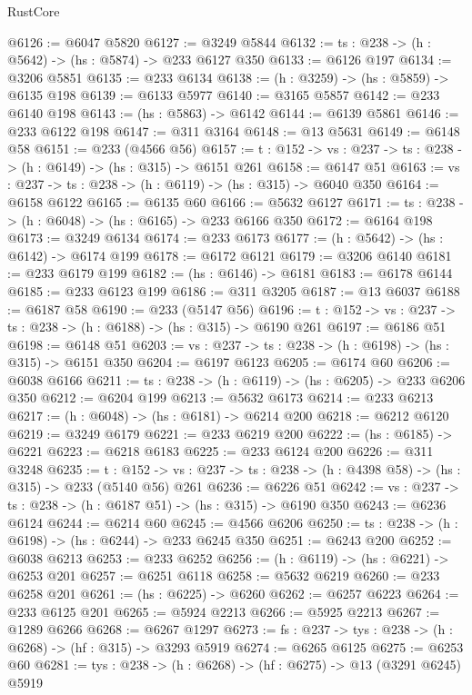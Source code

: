 \begin{lexlean}{RustCore}
\begin{coremodule}
@6126 := @6047 @5820
@6127 := @3249 @5844
@6132 := {ts : @238} -> (h : @5642) -> (hs : @5874) -> @233 @6127 @350
@6133 := @6126 @197
@6134 := @3206 @5851
@6135 := @233 @6134
@6138 := (h : @3259) -> (hs : @5859) -> @6135 @198
@6139 := @6133 @5977
@6140 := @3165 @5857
@6142 := @233 @6140 @198
@6143 := (hs : @5863) -> @6142
@6144 := @6139 @5861
@6146 := @233 @6122 @198
@6147 := @311 @3164
@6148 := @13 @5631
@6149 := @6148 @58
@6151 := @233 (@4566 @56)
@6157 := {t : @152} -> {vs : @237} -> {ts : @238} -> (h : @6149) -> (hs : @315) -> @6151 @261
@6158 := @6147 @51
@6163 := {vs : @237} -> {ts : @238} -> (h : @6119) -> (hs : @315) -> @6040 @350
@6164 := @6158 @6122
@6165 := @6135 @60
@6166 := @5632 @6127
@6171 := {ts : @238} -> (h : @6048) -> (hs : @6165) -> @233 @6166 @350
@6172 := @6164 @198
@6173 := @3249 @6134
@6174 := @233 @6173
@6177 := (h : @5642) -> (hs : @6142) -> @6174 @199
@6178 := @6172 @6121
@6179 := @3206 @6140
@6181 := @233 @6179 @199
@6182 := (hs : @6146) -> @6181
@6183 := @6178 @6144
@6185 := @233 @6123 @199
@6186 := @311 @3205
@6187 := @13 @6037
@6188 := @6187 @58
@6190 := @233 (@5147 @56)
@6196 := {t : @152} -> {vs : @237} -> {ts : @238} -> (h : @6188) -> (hs : @315) -> @6190 @261
@6197 := @6186 @51
@6198 := @6148 @51
@6203 := {vs : @237} -> {ts : @238} -> (h : @6198) -> (hs : @315) -> @6151 @350
@6204 := @6197 @6123
@6205 := @6174 @60
@6206 := @6038 @6166
@6211 := {ts : @238} -> (h : @6119) -> (hs : @6205) -> @233 @6206 @350
@6212 := @6204 @199
@6213 := @5632 @6173
@6214 := @233 @6213
@6217 := (h : @6048) -> (hs : @6181) -> @6214 @200
@6218 := @6212 @6120
@6219 := @3249 @6179
@6221 := @233 @6219 @200
@6222 := (hs : @6185) -> @6221
@6223 := @6218 @6183
@6225 := @233 @6124 @200
@6226 := @311 @3248
@6235 := {t : @152} ->
  {vs : @237} -> {ts : @238} -> (h : @4398 @58) -> (hs : @315) -> @233 (@5140 @56) @261
@6236 := @6226 @51
@6242 := {vs : @237} -> {ts : @238} -> (h : @6187 @51) -> (hs : @315) -> @6190 @350
@6243 := @6236 @6124
@6244 := @6214 @60
@6245 := @4566 @6206
@6250 := {ts : @238} -> (h : @6198) -> (hs : @6244) -> @233 @6245 @350
@6251 := @6243 @200
@6252 := @6038 @6213
@6253 := @233 @6252
@6256 := (h : @6119) -> (hs : @6221) -> @6253 @201
@6257 := @6251 @6118
@6258 := @5632 @6219
@6260 := @233 @6258 @201
@6261 := (hs : @6225) -> @6260
@6262 := @6257 @6223
@6264 := @233 @6125 @201
@6265 := @5924 @2213
@6266 := @5925 @2213
@6267 := @1289 @6266
@6268 := @6267 @1297
@6273 := {fs : @237} -> {tys : @238} -> (h : @6268) -> (hf : @315) -> @3293 @5919
@6274 := @6265 @6125
@6275 := @6253 @60
@6281 := {tys : @238} -> (h : @6268) -> (hf : @6275) -> @13 (@3291 @6245) @5919

\end{coremodule}
\end{lexlean}
